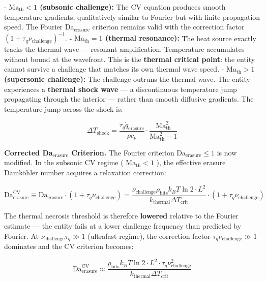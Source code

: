 \documentclass[11pt,a4paper]{article}
\theoremstyle{definition}
\theoremstyle{remark}
\begin{document}
- \textbf{$\mathrm{Ma}_{\text{th}} < 1$ (subsonic challenge):} The CV equation produces smooth temperature gradients, qualitatively similar to Fourier but with finite propagation speed. The Fourier Da$_{\text{erasure}}$ criterion remains valid with the correction factor $(1 + \tau_q \nu_{\text{challenge}})^{-1}$.
- \textbf{$\mathrm{Ma}_{\text{th}} = 1$ (thermal resonance):} The heat source exactly tracks the thermal wave — resonant amplification. Temperature accumulates without bound at the wavefront. This is the \textbf{thermal critical point}: the entity cannot survive a challenge that matches its own thermal wave speed.
- \textbf{$\mathrm{Ma}_{\text{th}} > 1$ (supersonic challenge):} The challenge outruns the thermal wave. The entity experiences a \textbf{thermal shock wave} — a discontinuous temperature jump propagating through the interior — rather than smooth diffusive gradients. The temperature jump across the shock is:


\begin{equation}
\Delta T_{\text{shock}} = \frac{\tau_q \dot{q}_{\text{erasure}}}{\rho c_p} \cdot \frac{\mathrm{Ma}_{\text{th}}^2}{\mathrm{Ma}_{\text{th}}^2 - 1}
\end{equation}


\textbf{Corrected Da$_{\text{erasure}}$ Criterion.} The Fourier criterion $\mathrm{Da}_{\text{erasure}} \leq 1$ is now modified. In the subsonic CV regime ( $\mathrm{Ma}_{\text{th}} < 1$ ), the effective erasure Damköhler number acquires a relaxation correction:


\begin{equation}
\mathrm{Da}_{\text{erasure}}^{\text{CV}} \equiv \mathrm{Da}_{\text{erasure}} \cdot (1 + \tau_q \nu_{\text{challenge}}) = \frac{\nu_{\text{challenge}} \rho_{\text{bits}} k_B T \ln 2 \cdot L^2}{k_{\text{thermal}} \Delta T_{\text{crit}}} \cdot (1 + \tau_q \nu_{\text{challenge}})
\end{equation}


The thermal necrosis threshold is therefore \textbf{lowered} relative to the Fourier estimate — the entity fails at a lower challenge frequency than predicted by Fourier. At $\nu_{\text{challenge}} \tau_q \gg 1$ (ultrafast regime), the correction factor $\tau_q \nu_{\text{challenge}} \gg 1$ dominates and the CV criterion becomes:


\begin{equation}
\mathrm{Da}_{\text{erasure}}^{\text{CV}} \approx \frac{\rho_{\text{bits}} k_B T \ln 2 \cdot L^2 \cdot \tau_q \nu_{\text{challenge}}^2}{k_{\text{thermal}} \Delta T_{\text{crit}}}
\end{equation}
\end{document}
